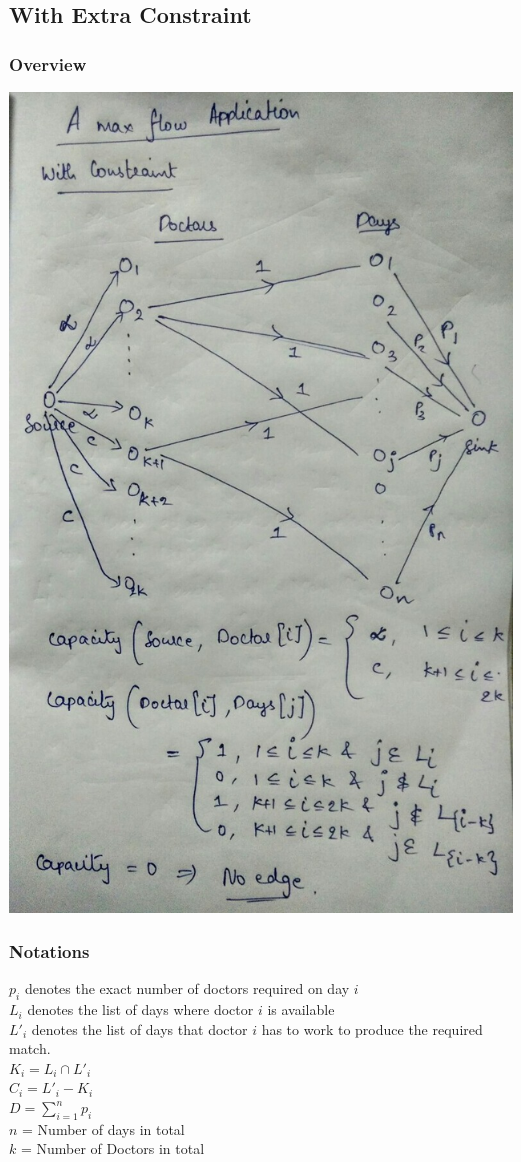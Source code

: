 \documentclass{article}
\begin{document}
\subsection{With Extra Constraint}
\subsubsection{Overview}
\includegraphics[scale=0.5]{3b.jpg}
\newpage
\subsubsection{Notations}
$p_i$ denotes the exact number of doctors required on day $i$ \\
$L_i$ denotes the list of days where doctor $i$ is available \\
$L'_i$ denotes the list of days that doctor $i$ has to work to produce the required match. \\
$K_i = L_i \cap  L'_i$ \\
$C_i = L'_i - K_i$ \\ 
$D = \sum_{i=1}^{n} p_i$ \\
$n$ = Number of days in total \\
$k$ = Number of Doctors in total \\ 
\end{document}
